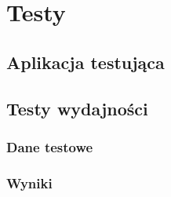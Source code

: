 \documentclass[a4paper,12pt]{article}
\begin{document}
\section{Testy}

\subsection{Aplikacja testująca}

\subsection{Testy wydajności}

\subsubsection{Dane testowe}

\subsubsection{Wyniki}
\end{document}
